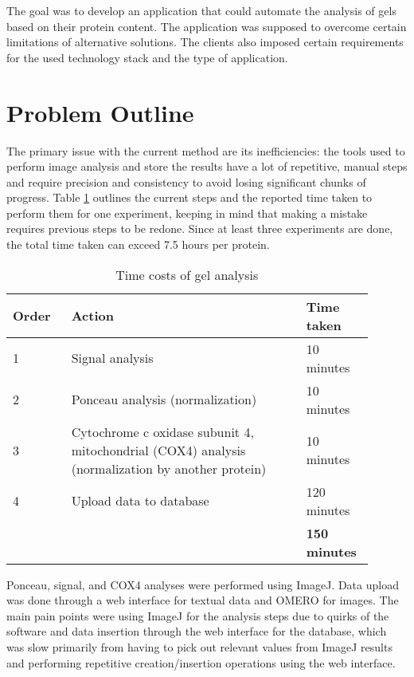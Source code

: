 The goal was to develop an application that could automate the analysis of gels based on their protein content. The application was supposed to overcome certain limitations of alternative solutions. The clients also imposed certain requirements for the used technology stack and the type of application.

\section{Problem Outline}
The primary issue with the current method are its inefficiencies: the tools used to perform image analysis and store the results have a lot of repetitive, manual steps and require precision and consistency to avoid losing significant chunks of progress. Table \ref{table:time-costs} outlines the current steps and the reported time taken to perform them for one experiment, keeping in mind that making a mistake requires previous steps to be redone. Since at least three experiments are done, the total time taken can exceed 7.5 hours per protein.

\begin{table}[h!]
\small
\begin{tabular}{|p{0.15\linewidth} | p{0.60\linewidth} | p{0.15\linewidth}|}
 \hline
 \textbf{Order} & \textbf{Action} &  \textbf{Time taken} \\
 \hline
1 & Signal analysis & 10 minutes \\ \hline
2 & Ponceau analysis (normalization) & 10 minutes \\ \hline
3 & Cytochrome c oxidase subunit 4, mitochondrial (COX4) analysis (normalization by another protein) & 10 minutes \\ \hline
4 & Upload data to database & 120 minutes \\ \hline
 &  & \textbf{150 minutes} \\ \hline
\end{tabular}
\caption{Time costs of gel analysis}\label{table:time-costs}
\end{table}

Ponceau, signal, and COX4 analyses were performed using ImageJ. Data upload was done through a web interface for textual data and OMERO for images. The main pain points were using ImageJ for the analysis steps due to quirks of the software and data insertion through the web interface for the database, which was slow primarily from having to pick out relevant values from ImageJ results and performing repetitive creation/insertion operations using the web interface. 

